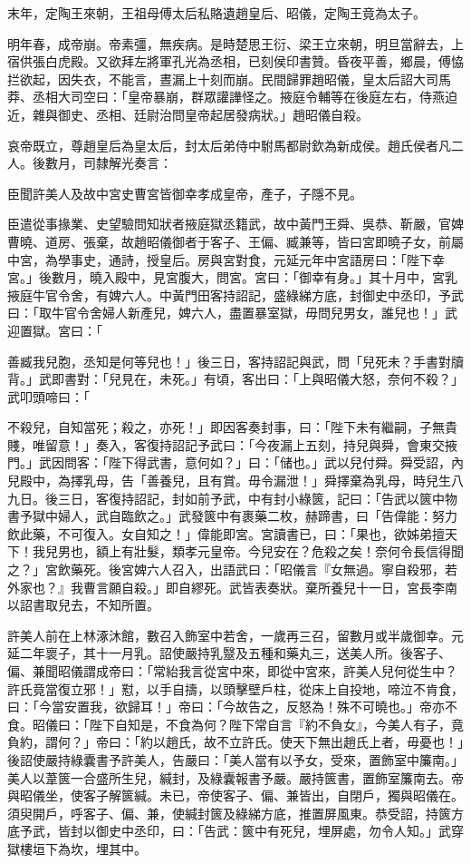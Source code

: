\begin{pinyinscope}
末年，定陶王來朝，王祖母傅太后私賂遺趙皇后、昭儀，定陶王竟為太子。

明年春，成帝崩。帝素彊，無疾病。是時楚思王衍、梁王立來朝，明旦當辭去，上宿供張白虎殿。又欲拜左將軍孔光為丞相，已刻侯印書贊。昏夜平善，鄉晨，傅恊拦欲起，因失衣，不能言，晝漏上十刻而崩。民間歸罪趙昭儀，皇太后詔大司馬莽、丞相大司空曰：「皇帝暴崩，群眾讙譁怪之。掖庭令輔等在後庭左右，侍燕迫近，雜與御史、丞相、廷尉治問皇帝起居發病狀。」趙昭儀自殺。

哀帝既立，尊趙皇后為皇太后，封太后弟侍中駙馬都尉欽為新成侯。趙氏侯者凡二人。後數月，司隸解光奏言：

臣聞許美人及故中宮史曹宮皆御幸孝成皇帝，產子，子隱不見。

臣遣從事掾業、史望驗問知狀者掖庭獄丞籍武，故中黃門王舜、吳恭、靳嚴，官婢曹曉、道房、張棄，故趙昭儀御者于客子、王偏、臧兼等，皆曰宮即曉子女，前屬中宮，為學事史，通詩，授皇后。房與宮對食，元延元年中宮語房曰：「陛下幸宮。」後數月，曉入殿中，見宮腹大，問宮。宮曰：「御幸有身。」其十月中，宮乳掖庭牛官令舍，有婢六人。中黃門田客持詔記，盛綠綈方底，封御史中丞印，予武曰：「取牛官令舍婦人新產兒，婢六人，盡置暴室獄，毋問兒男女，誰兒也！」武迎置獄。宮曰：「

善臧我兒胞，丞知是何等兒也！」後三日，客持詔記與武，問「兒死未？手書對牘背。」武即書對：「兒見在，未死。」有頃，客出曰：「上與昭儀大怒，奈何不殺？」武叩頭啼曰：「

不殺兒，自知當死；殺之，亦死！」即因客奏封事，曰：「陛下未有繼嗣，子無貴賤，唯留意！」奏入，客復持詔記予武曰：「今夜漏上五刻，持兒與舜，會東交掖門。」武因問客：「陛下得武書，意何如？」曰：「储也。」武以兒付舜。舜受詔，內兒殿中，為擇乳母，告「善養兒，且有賞。毋令漏泄！」舜擇棄為乳母，時兒生八九日。後三日，客復持詔記，封如前予武，中有封小綠篋，記曰：「告武以篋中物書予獄中婦人，武自臨飲之。」武發篋中有裹藥二枚，赫蹄書，曰「告偉能：努力飲此藥，不可復入。女自知之！」偉能即宮。宮讀書已，曰：「果也，欲姊弟擅天下！我兒男也，額上有壯髮，類孝元皇帝。今兒安在？危殺之矣！奈何令長信得聞之？」宮飲藥死。後宮婢六人召入，出語武曰：「昭儀言『女無過。寧自殺邪，若外家也？』我曹言願自殺。」即自繆死。武皆表奏狀。棄所養兒十一日，宮長李南以詔書取兒去，不知所置。

許美人前在上林涿沐館，數召入飾室中若舍，一歲再三召，留數月或半歲御幸。元延二年褱子，其十一月乳。詔使嚴持乳毉及五種和藥丸三，送美人所。後客子、偏、兼聞昭儀謂成帝曰：「常紿我言從宮中來，即從中宮來，許美人兒何從生中？許氏竟當復立邪！」懟，以手自擣，以頭擊壁戶柱，從床上自投地，啼泣不肯食，曰：「今當安置我，欲歸耳！」帝曰：「今故告之，反怒為！殊不可曉也。」帝亦不食。昭儀曰：「陛下自知是，不食為何？陛下常自言『約不負女』，今美人有子，竟負約，謂何？」帝曰：「約以趙氏，故不立許氏。使天下無出趙氏上者，毋憂也！」後詔使嚴持綠囊書予許美人，告嚴曰：「美人當有以予女，受來，置飾室中簾南。」美人以葦篋一合盛所生兒，緘封，及綠囊報書予嚴。嚴持篋書，置飾室簾南去。帝與昭儀坐，使客子解篋緘。未已，帝使客子、偏、兼皆出，自閉戶，獨與昭儀在。須臾開戶，呼客子、偏、兼，使緘封篋及綠綈方底，推置屏風東。恭受詔，持篋方底予武，皆封以御史中丞印，曰：「告武：篋中有死兒，埋屏處，勿令人知。」武穿獄樓垣下為坎，埋其中。


\end{pinyinscope}

